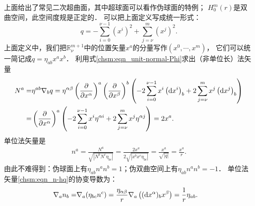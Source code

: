 上面给出了常见二次超曲面，其中超球面可以看作伪球面的特例；
$H^m_0(r)$是双曲空间，此空间度规是正定的．
可以把上面定义写成统一形式：
\begin{equation}\label{chsm:eqn_hqq}
    q=-\sum_{i=0}^{\nu-1} (x^i)^2+\sum_{j=\nu}^{m} (x^j)^2 .
\end{equation}
上面定义中，我们把$\mathbb{R}^{m+1}_\nu$中的位置矢量$x^a$的分量写作$(x^0,\cdots,x^{m})$，
它们可以统一简记成$q=\eta_{ab}x^a x^b$．
利用式\eqref{chsm:eqn_unit-normal-Phi}求出（非单位长）法矢量
\begin{align*}
    N^a=& \eta^{ab} \nabla_bq= \eta^{\alpha\beta} \left(\frac{\partial }{\partial x^\alpha }\right)^a 
    \left(\frac{\partial }{\partial x^\beta }\right)^b 
    \left(-2 \sum_{i=0}^{\nu-1} x^i \left({\rm d}x^i\right)_b
    +2\sum_{j=\nu}^{m} x^j \left({\rm d}x^j\right)_b \right) \\
    =& \left(\frac{\partial }{\partial x^\alpha }\right)^a 
    \left(-2 \sum_{i=0}^{\nu-1} x^i \eta^{\alpha i} 
    +2\sum_{j=\nu}^{m} x^j \eta^{\alpha j} \right)  = 2 x^a .
\end{align*}
单位法矢量是
\begin{align}
    n^a=\frac{ N^a}{\sqrt{|N^b N^c \eta_{bc}|}}=\frac{2 x^a}{2\sqrt{|x^b x^c \eta_{bc}|}}
    =\frac{ x^a}{\sqrt{|q|}}=\frac{ x^a}{r}      . \label{chsm:eqn_n-hq}
\end{align}
由此不难得到：伪球面上有$\eta_{ab}n^a n^b =1$；伪双曲空间上有$\eta_{ab}n^a n^b =-1$．
单位法矢量\eqref{chsm:eqn_n-hq}的协变导数为：
\begin{align}
    \nabla_a n_b =& \nabla_a (\eta_{bc} n^c) 
     =\frac{ \eta_{\alpha\beta} }{r}\nabla_a \left(({\rm d}x^\alpha)_b x^\beta \right) 
     =\frac{1}{r}\eta_{ab} .  \label{chsm:eqn_Dnhq}
\end{align}


